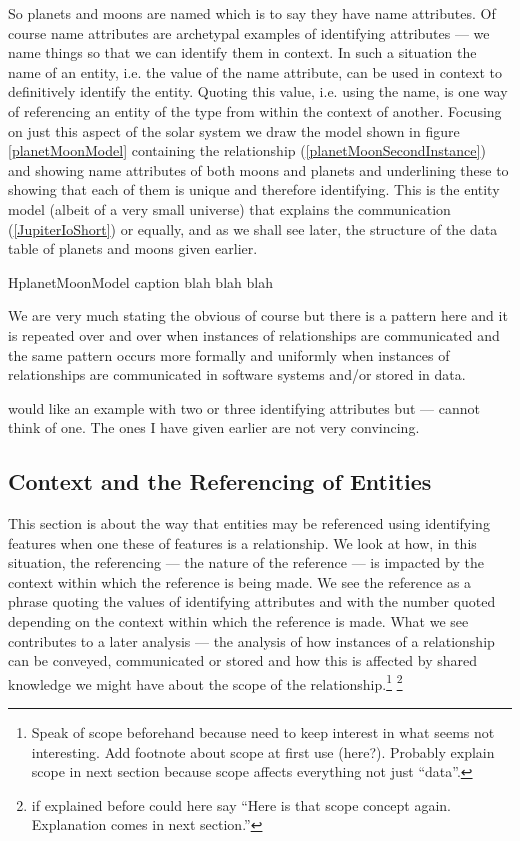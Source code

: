 \mynote So planets and moons are named which is to say they have name attributes.
Of course name attributes are archetypal examples of identifying attributes --- we name things so that we can identify them in context. In such a situation the name of an entity, i.e. the value of the name attribute,  can be used in context to definitively identify the entity.
Quoting this value, i.e. using the name, is one way of referencing an entity of the type from within the context of another.
 \mynote
Focusing on just this aspect of the solar system we  draw the model shown in figure
\ref{planetMoonModel}
containing the relationship (\ref{planetMoonSecondInstance}) and showing name attributes of both moons and planets and
underlining these to showing that each of them is unique and therefore identifying. 
This is the entity model (albeit of a very small universe) that explains the communication (\ref{JupiterIoShort}) or equally, and as we shall see later, the structure of the data table of planets and moons given earlier.
\begin{erboxedFigure} {H}{planetMoonModel}
{
caption blah blah blah
 }

\end{erboxedFigure}
\mynote
We are very much stating the obvious of course but there is a pattern here and it is repeated over and over when instances of relationships are communicated  and the same pattern occurs more formally  and uniformly when instances of relationships are communicated in software systems and/or stored in data.

\begin{noteforfuture}
would like an example with two or three identifying attributes but --- cannot think of one. The ones I have given earlier are not very convincing.
\end{noteforfuture}

\subsection{Context and the Referencing of Entities}
\mynote
This section is about the way that entities may be referenced using identifying features
 when one these of features is a relationship.
We look at how,  in this situation, the referencing 
--- the nature of the reference ---   
is impacted by the context within which the reference is being made. 
We see the reference as a phrase quoting the values of identifying attributes
and with the number quoted depending on 
the context within which the reference is made.
What we see contributes to a later analysis --- the analysis of  how 
instances of a relationship can be conveyed, communicated or stored and
how this is affected by shared knowledge we might have about 
the scope of  the relationship.\footnote{Speak of scope beforehand because need to keep interest in what seems not interesting. Add footnote about scope at first use (here?). Probably explain scope in next section because scope affects everything not just ``data''.} \footnote{if explained before could here say ``Here is that scope concept again. Explanation comes in next section.''}

